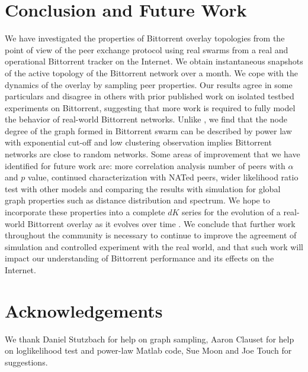 \documentclass[10pt,conference,letterpaper,final]{IEEEtran}
\begin{document}
\section{Conclusion and Future Work}\label{conclude}
We have investigated the properties of Bittorrent overlay topologies from the point of view of the peer exchange protocol using real swarms from a real and operational Bittorrent tracker on the Internet. 
We obtain instantaneous snapshots of the active topology of the Bittorrent network over a month.
We cope with the dynamics of the overlay by sampling peer properties. 
Our results agree in some particulars and disagree in others with prior published work on isolated testbed experiments on Bittorrent, suggesting that more work is required to fully model the behavior of real-world Bittorrent networks.
Unlike \cite{dale2008evolution}, we find that the node degree of the graph formed in Bittorrent swarm can be described by power law with exponential cut-off and low clustering observation implies Bittorrent networks are close to random networks.
Some areas of improvement that we have identified for future work are: more correlation analysis number of peers with $\alpha$ and $p$ value, continued characterization with NATed peers, wider likelihood ratio test with other models and comparing the results with simulation for global graph properties such as distance distribution and spectrum.
We hope to incorporate these properties into a complete $dK$ series for the evolution of a real-world Bittorrent overlay as it evolves over time \cite{mahadevan2006systematic}. 
We conclude that further work throughout the community is necessary to continue to improve the agreement of simulation and controlled experiment with the real world, and that such work will impact our understanding of Bittorrent performance and its effects on the Internet.


\section*{Acknowledgements}
We thank Daniel Stutzbach for help on graph sampling, Aaron Clauset for help on loglikelihood test and power-law Matlab code, Sue Moon and Joe Touch for suggestions.



\end{document}
